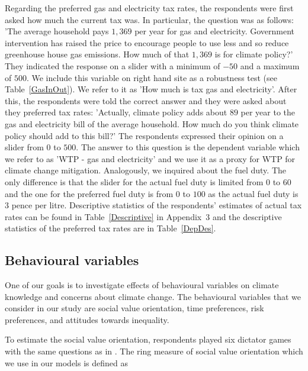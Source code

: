 \documentclass[a4paper,12pt]{article}
\begin{document}
\vspace{1cm}







Regarding the preferred gas and electricity tax rates, the respondents were first asked how much the current tax was. In particular, the question was as follows: 'The average household pays \textsterling$1,369$ per year for gas and electricity. Government intervention has raised the price to encourage people to use less and so reduce greenhouse house gas emissions. How much of that \textsterling$1,369$ is for climate policy?' They indicated the response on a slider with a minimum of $-50$ and a maximum of $500$. We include this variable on right hand site as a robustness test (see Table~\ref{GasInOut}). We refer to it as 'How much is tax gas and electricity'. After this, the respondents were told the correct answer and they were asked about they preferred tax rates: 'Actually, climate policy adds about \textsterling$89$ per year to the gas and electricity bill of the average household. How much do you think climate policy should add to this bill?' The respondents expressed their opinion on a slider from $0$ to $500$. The answer to this question is the dependent variable which we refer to as 'WTP - gas and electricity' and we use it as a proxy for WTP for climate change mitigation. Analogously, we inquired about the fuel duty. The only difference is that the slider for the actual fuel duty is limited from $0$ to $60$ and the one for the preferred fuel duty is from $0$ to $100$ as the actual fuel duty is $3$ pence per litre. Descriptive statistics of the respondents' estimates of actual tax rates can be found in Table~\ref{Descriptive} in Appendix~$3$ and the descriptive statistics of the preferred tax rates are in Table~\ref{DepDes}.

\subsection{Behavioural variables}\label{BehaviouralVars}

One of our goals is to investigate effects of behavioural variables on climate knowledge and concerns about climate change. The behavioural variables that we consider in our study are social value orientation, time preferences, risk preferences, and attitudes towards inequality.


To estimate the social value orientation, respondents played six dictator games with the same questions as in \citet{murphy2011SVO}. The ring measure of social value orientation which we use in our models is defined as
\end{document}
